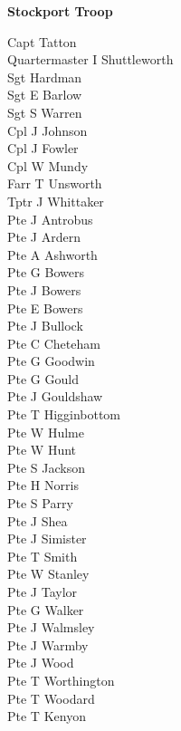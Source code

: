 \vspace*{10mm}

\begin{center}
  \Large
  \textbf{Stockport Troop}
\end{center}

\begin{multicols}{3}
  \small
  \noindent
  Capt Tatton \\
  Quartermaster I Shuttleworth \\
  Sgt Hardman \\
  Sgt E Barlow \\
  Sgt S Warren \\
  Cpl J Johnson \\
  Cpl J Fowler \\
  Cpl W Mundy \\
  Farr T Unsworth \\
  Tptr J Whittaker \\
  Pte J Antrobus \\
  Pte J Ardern \\
  Pte A Ashworth \\
  Pte G Bowers \\
  Pte J Bowers \\
  Pte E Bowers \\
  Pte J Bullock \\
  Pte C Cheteham \\
  Pte G Goodwin \\
  Pte G Gould \\
  Pte J Gouldshaw \\
  Pte T Higginbottom \\
  Pte W Hulme \\
  Pte W Hunt \\
  Pte S Jackson \\
  Pte H Norris \\
  Pte S Parry \\
  Pte J Shea \\
  Pte J Simister \\
  Pte T Smith \\
  Pte W Stanley \\
  Pte J Taylor \\
  Pte G Walker \\
  Pte J Walmsley \\
  Pte J Warmby \\
  Pte J Wood \\
  Pte T Worthington \\
  Pte T Woodard \\
  Pte T Kenyon \\
\end{multicols}
